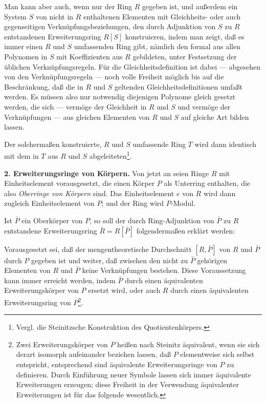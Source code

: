 \documentclass[12pt,a4paper]{article}
\theoremstyle{plain}
\theoremstyle{definition}
\theoremstyle{remark}
\begin{document}
Man kann aber auch, wenn nur der Ring $R$ gegeben ist, und außerdem ein System $S$ von nicht in $R$ enthaltenen Elementen mit Gleichheits- oder auch gegenseitigen Verknüpfungsbeziehungen, den durch Adjunktion von $S$ zu $R$ entstandenen Erweiterungsring $R[S]$ konstruieren, indem man zeigt, daß es immer einen $R$ und $S$ umfassenden Ring gibt, nämlich den formal aus allen Polynomen in $S$ mit Koeffizienten aus $R$ gebildeten, unter Festsetzung der üblichen Verknüpfungsregeln. Für die Gleichheitsdefinition ist dabei --- abgesehen von den Verknüpfungsregeln --- noch volle Freiheit möglich bis auf die Beschränkung, daß die in $R$ und $S$ geltenden Gleichheitsdefinitionen umfaßt werden. Es müssen also nur notwendig diejenigen Polynome gleich gesetzt werden, die sich --- vermöge der Gleichheit in $R$ und $S$ und vermöge der Verknüpfungen --- aus gleichen Elementen von $R$ und $S$ auf gleiche Art bilden lassen.

Der solchermaßen konstruierte, $R$ und $S$ umfassende Ring $T$ wird dann identisch mit dem in $T$ aus $R$ und $S$ abgeleiteten\footnote{Vergl. die Steinitzsche Konstruktion des Quotientenkörpers.}.

\medskip
\noindent
\textbf{2. Erweiterungsringe von Körpern.} Von jetzt an seien Ringe $R$ mit Einheitselement vorausgesetzt, die einen Körper $P$ als Unterring enthalten, die also \textit{Oberringe von Körpern} sind. Das Einheitselement $e$ von $R$ wird dann zugleich Einheitselement von $P$; und der Ring wird $P$-Modul.

Ist $\bar{P}$ ein Oberkörper von $P$, so soll der durch Ring-Adjunktion von $\bar{P}$ zu $R$ entstandene Erweiterungsring $\bar{R} = R[\bar{P}]$ folgendermaßen erklärt werden:

Vorausgesetzt sei, daß der mengentheoretische Durchschnitt $[R, \bar{P}]$ von $R$ und $\bar{P}$ durch $P$ gegeben ist und weiter, daß zwischen den nicht zu $\bar{P}$ gehörigen Elementen von $R$ und $\bar{P}$ keine Verknüpfungen bestehen. Diese Voraussetzung kann immer erreicht werden, indem $\bar{P}$ durch einen äquivalenten Erweiterungskörper von $P$ ersetzt wird, oder auch $R$ durch einen äquivalenten Erweiterungsring von $P$\footnote{Zwei Erweiterungskörper von $P$ heißen nach Steinitz \glqq äquivalent\grqq, wenn sie sich derart isomorph aufeinander beziehen lassen, daß $P$ elementweise sich selbst entspricht, entsprechend sind äquivalente Erweiterungsringe von $P$ zu definieren. Durch Einführung neuer Symbole lassen sich immer äquivalente Erweiterungen erzeugen; diese Freiheit in der Verwendung äquivalenter Erweiterungen ist für das folgende wesentlich.}.
\end{document}
